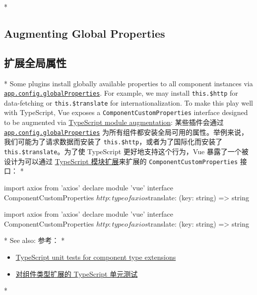 \begin{paracol}{2} 
 
\switchcolumn[0]*%
\subsection{Augmenting Global Properties}
\switchcolumn
\subsection{扩展全局属性}
\switchcolumn[0]*%
Some plugins install globally available properties to all component
instances via
\href{https://vuejs.org/api/application.html\#app-config-globalproperties}{\texttt{app.config.globalProperties}}.
For example, we may install \texttt{this.\$http} for data-fetching or
\texttt{this.\$translate} for internationalization. To make this play
well with TypeScript, Vue exposes a \texttt{ComponentCustomProperties}
interface designed to be augmented via
\href{https://www.typescriptlang.org/docs/handbook/declaration-merging.html\#module-augmentation}{TypeScript
module augmentation}:
\switchcolumn
某些插件会通过
\href{https://cn.vuejs.org/api/application.html\#app-config-globalproperties}{\texttt{app.config.globalProperties}}
为所有组件都安装全局可用的属性。举例来说，我们可能为了请求数据而安装了
\texttt{this.\$http}，或者为了国际化而安装了
\texttt{this.\$translate}。为了使 TypeScript 更好地支持这个行为，Vue
暴露了一个被设计为可以通过
\href{https://www.typescriptlang.org/docs/handbook/declaration-merging.html\#module-augmentation}{TypeScript
模块扩展}来扩展的 \texttt{ComponentCustomProperties} 接口：
\switchcolumn[0]*%
\begin{codeTs}
import axios from 'axios'
declare module 'vue' {
  interface ComponentCustomProperties {
    $http: typeof axios
    $translate: (key: string) => string
  }
}
\end{codeTs}
\switchcolumn
\begin{codeTs}
import axios from 'axios'
declare module 'vue' {
  interface ComponentCustomProperties {
    $http: typeof axios
    $translate: (key: string) => string
  }
}
\end{codeTs}
\switchcolumn[0]*%
See also:
\switchcolumn
参考：
\switchcolumn[0]*%
\begin{itemize}
\item
  \href{https://github.com/vuejs/core/blob/main/packages/dts-test/componentTypeExtensions.test-d.tsx}{TypeScript
  unit tests for component type extensions}
\end{itemize}
\switchcolumn
\begin{itemize}
\item
  \href{https://github.com/vuejs/core/blob/main/packages/dts-test/componentTypeExtensions.test-d.tsx}{对组件类型扩展的
  TypeScript 单元测试}
\end{itemize}
\switchcolumn[0]*%

\end{paracol}
